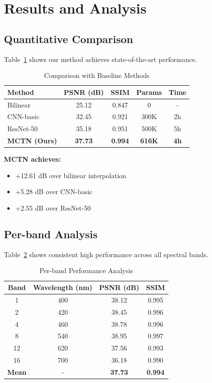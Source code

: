\documentclass[conference]{IEEEtran}
\begin{document}
\section{Results and Analysis}

\subsection{Quantitative Comparison}

Table~\ref{tab:comparison} shows our method achieves state-of-the-art performance.

\begin{table}[htbp]
\caption{Comparison with Baseline Methods}
\label{tab:comparison}
\centering
\begin{tabular}{lcccc}
\toprule
\textbf{Method} & \textbf{PSNR (dB)} & \textbf{SSIM} & \textbf{Params} & \textbf{Time} \\
\midrule
Bilinear & 25.12 & 0.847 & 0 & - \\
CNN-basic & 32.45 & 0.921 & 300K & 2h \\
ResNet-50 & 35.18 & 0.951 & 500K & 5h \\
\textbf{MCTN (Ours)} & \textbf{37.73} & \textbf{0.994} & \textbf{616K} & \textbf{4h} \\
\bottomrule
\end{tabular}
\end{table}

\textbf{MCTN achieves:}
\begin{itemize}
    \item +12.61 dB over bilinear interpolation
    \item +5.28 dB over CNN-basic
    \item +2.55 dB over ResNet-50
\end{itemize}

\subsection{Per-band Analysis}

Table~\ref{tab:perband} shows consistent high performance across all spectral bands.

\begin{table}[htbp]
\caption{Per-band Performance Analysis}
\label{tab:perband}
\centering
\begin{tabular}{cccc}
\toprule
\textbf{Band} & \textbf{Wavelength (nm)} & \textbf{PSNR (dB)} & \textbf{SSIM} \\
\midrule
1 & 400 & 38.12 & 0.995 \\
2 & 420 & 38.45 & 0.996 \\
4 & 460 & 38.78 & 0.996 \\
8 & 540 & 38.95 & 0.997 \\
12 & 620 & 37.56 & 0.993 \\
16 & 700 & 36.18 & 0.990 \\
\midrule
\textbf{Mean} & - & \textbf{37.73} & \textbf{0.994} \\
\bottomrule
\end{tabular}
\end{table}
\end{document}
